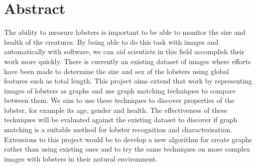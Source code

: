 \section*{Abstract}
The ability to measure lobsters is important to be able to monitor the size and health of the creatures. By being able to do this task with images and automatically with software, we can aid scientists in this field accomplish their work more quickly. There is currently an existing dataset of images where efforts have been made to determine the size and sex of the lobsters using global features such as total length.
\n
This project aims extend that work by representing images of lobsters as graphs and use graph matching techniques to compare between them. We aim to use these techniques to discover properties of the lobster, for example its age, gender and health. The effectiveness of these techniques will be evaluated against the existing dataset to discover if graph matching is a suitable method for lobster recognition and characterisation. Extensions to this project would be to develop a new algorithm for create graphs rather than using existing ones and to try the same techniques on more complex images with lobsters in their natural environment.

